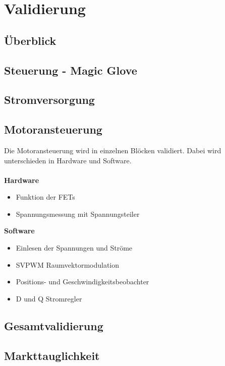 \chapter{Validierung} 

\section{Überblick}
\section{Steuerung - Magic Glove}
\section{Stromversorgung}

\section{Motoransteuerung}
Die Motoransteuerung wird in einzelnen Blöcken validiert. Dabei wird unterschieden in Hardware und Software.\\
\\
\textbf{Hardware}
\begin{itemize}
	\item Funktion der FETs
	\item Spannungsmessung mit Spannungsteiler
\end{itemize}
\textbf{Software}
\begin{itemize}
	\item Einlesen der Spannungen und Ströme
	\item SVPWM Raumvektormodulation
	\item Positions- und Geschwindigkeitsbeobachter
	\item D und Q Stromregler
\end{itemize}

\section{Gesamtvalidierung}
\section{Markttauglichkeit}